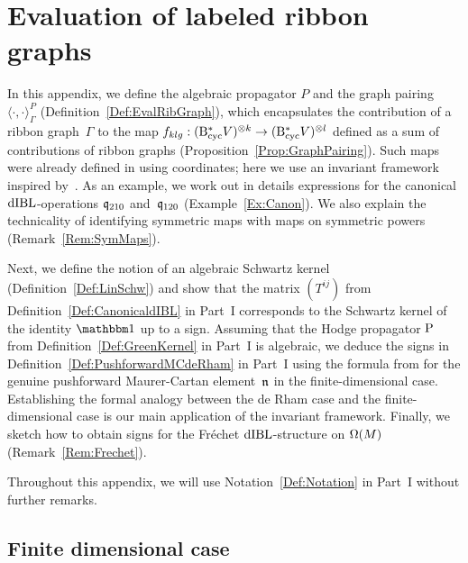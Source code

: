 \documentclass[\MainFolder/Text.tex]{subfiles}
\begin{document}
\chapter{Evaluation of labeled ribbon graphs}
\label{Section:Appendix}
In this appendix, we define the algebraic propagator $P$ and the graph pairing $\langle \cdot, \cdot \rangle^P_\Gamma$ (Definition~\ref{Def:EvalRibGraph}), which encapsulates the contribution of a ribbon graph~$\Gamma$ to the map $f_{klg}: (\mathrm{B}_{\mathrm{cyc}}^* V)^{\otimes k} \rightarrow (\mathrm{B}_{\mathrm{cyc}}^* V)^{\otimes l}$ defined as a sum of contributions of ribbon graphs (Proposition~\ref{Prop:GraphPairing}). Such maps were already defined in \cite[Section 11]{Cieliebak2015} using coordinates; here we use an invariant framework inspired by~\cite{Mnev2017}. As an example, we work out in details expressions for the canonical $\mathrm{dIBL}$-operations $\mathfrak{q}_{210}$ and~$\mathfrak{q}_{120}$ (Example~\ref{Ex:Canon}). We also explain the technicality of identifying symmetric maps with maps on symmetric powers (Remark~\ref{Rem:SymMaps}).

Next, we define the notion of an algebraic Schwartz kernel (Definition~\ref{Def:LinSchw}) and show that the matrix $(T^{ij})$ from Definition~\ref{Def:CanonicaldIBL} in Part~I corresponds to the Schwartz kernel of the identity $\Id$ up to a sign. Assuming that the Hodge propagator $\mathrm{P}$ from Definition~\ref{Def:GreenKernel} in Part~I is algebraic, we deduce the signs in Definition~\ref{Def:PushforwardMCdeRham} in Part~I using the formula from \cite[Remark 12.10]{Cieliebak2015} for the genuine pushforward Maurer-Cartan element~$\mathfrak{n}$ in the finite-dimensional case. Establishing the formal analogy between the de Rham case and the finite-dimensional case is our main application of the invariant framework. Finally, we sketch how to obtain signs for the Fr\'echet $\mathrm{dIBL}$-structure on $\Omega(M)$ (Remark~\ref{Rem:Frechet}).


Throughout this appendix, we will use Notation~\ref{Def:Notation} in Part~I without further remarks.
%

\section{Finite dimensional case}
\end{document}
